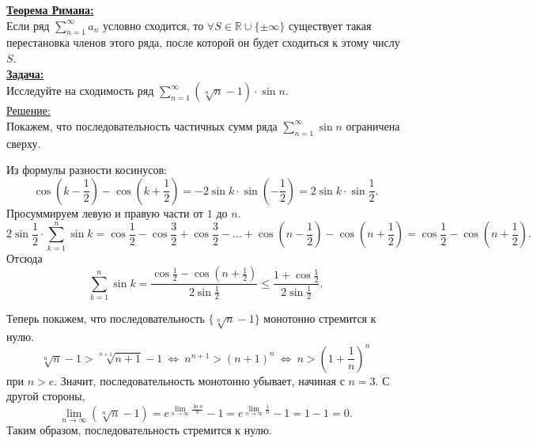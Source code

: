 \documentclass{report}
\begin{document}
\textbf{\underline{Теорема Римана:}} \\
    Если ряд \( \sum_{n = 1}^{\infty} a_n \) условно сходится, то \( \forall S \in \mathbb{R} \cup \{\pm \infty\} \) существует такая перестановка членов этого ряда, после которой он будет сходиться к этому числу \( S \).
\\

\textbf{\underline{Задача:}} \\
Исследуйте на сходимость ряд \( \sum_{n = 1}^{\infty} (\sqrt[n]{n} - 1) \cdot \sin n \).
\\

\underline{Решение:} \\
Покажем, что последовательность частичных сумм ряда \( \sum_{n = 1}^{\infty} \sin n \) ограничена сверху. \par
Из формулы разности косинусов:
\begin{equation*}
    \cos(k - \frac{1}{2}) - \cos(k + \frac{1}{2}) = -2\sin k \cdot \sin (-\frac{1}{2}) = 2\sin k \cdot \sin \frac{1}{2}.
\end{equation*} 
Просуммируем левую и правую части от \( 1 \) до \( n \).
\begin{equation*}
    2\sin \frac{1}{2} \cdot \sum_{k = 1}^{n} \sin k = \cos \frac{1}{2} - \cos \frac{3}{2} + \cos \frac{3}{2} - \dotsc + \cos(n - \frac{1}{2}) - \cos(n + \frac{1}{2}) = \cos \frac{1}{2} - \cos(n + \frac{1}{2}).
\end{equation*}
Отсюда
\begin{equation*}
    \sum_{k = 1}^{n} \sin k = \frac{\cos \frac{1}{2} - \cos(n + \frac{1}{2})}{2\sin \frac{1}{2}} \leq \frac{1 + \cos \frac{1}{2}}{2\sin\frac{1}{2}}.
\end{equation*}

Теперь покажем, что последовательность \( \{ \sqrt[n]{n} - 1 \} \) монотонно стремится к нулю.
\begin{equation*}
    \sqrt[n]{n} - 1 > \sqrt[n + 1]{n + 1} - 1\ \Leftrightarrow\ n^{n + 1} > (n + 1)^n\ \Leftrightarrow\ n > \left(1 + \frac{1}{n} \right)^n
\end{equation*}
при \( n > e \). Значит, последовательность монотонно убывает, начиная с \( n = 3 \). С другой стороны, 
\begin{equation*}
    \lim_{n \rightarrow \infty} (\sqrt[n]{n} - 1) = e^{\lim_{n \rightarrow \infty} \frac{\ln n}{n}} - 1 = e^{\lim_{n \rightarrow \infty} \frac{1}{n}} - 1 = 1 - 1 = 0.
\end{equation*}
Таким образом, последовательность стремится к нулю. \par
\end{document}
